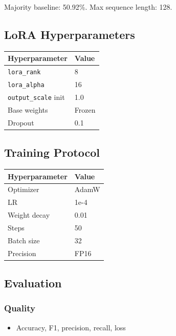 Majority baseline: 50.92\%. Max sequence length: 128.

\subsection{LoRA Hyperparameters}

\begin{table}[H]
\centering
\small
\begin{tabular}{ll}
\toprule
\textbf{Hyperparameter} & \textbf{Value} \\
\midrule
\texttt{lora\_rank} & 8 \\
\texttt{lora\_alpha} & 16 \\
\texttt{output\_scale} init & 1.0 \\
Base weights & Frozen \\
Dropout & 0.1 \\
\bottomrule
\end{tabular}
\end{table}

\subsection{Training Protocol}

\begin{table}[H]
\centering
\small
\begin{tabular}{ll}
\toprule
\textbf{Hyperparameter} & \textbf{Value} \\
\midrule
Optimizer & AdamW \\
LR & 1e-4 \\
Weight decay & 0.01 \\
Steps & 50 \\
Batch size & 32 \\
Precision & FP16 \\
\bottomrule
\end{tabular}
\end{table}

\subsection{Evaluation}

\subsubsection{Quality}
\begin{itemize}
\item Accuracy, F1, precision, recall, loss

\end{itemize}
